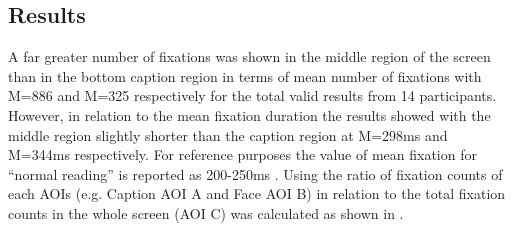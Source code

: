 \documentclass[output=paper]{langsci/langscibook}
\begin{document}
\subsection{Results}

A far greater number of fixations was shown in the middle region of the screen than in the bottom caption region in terms of mean number of fixations with M=886 and M=325 respectively for the total valid results from 14 participants. However, in relation to the mean fixation duration the results showed with the middle region slightly shorter than the caption region at M=298ms and M=344ms respectively. For reference purposes the value of mean fixation for ``normal reading'' is reported as 200-250ms \citep{Bruycker2007}. Using the ratio of fixation counts of each AOIs (e.g. Caption AOI A and Face AOI B) in relation to the total fixation counts in the whole screen (AOI C) was calculated as shown in . 
\end{document}
